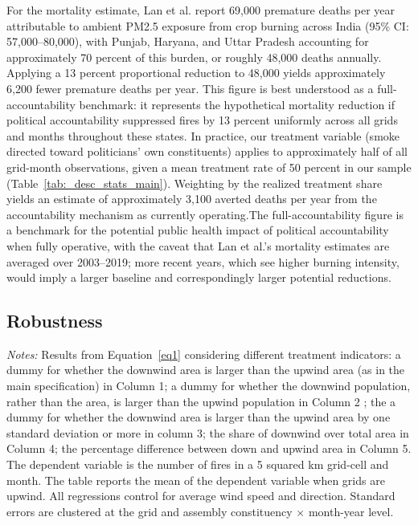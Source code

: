 \documentclass[12pt]{article}
\begin{document}
For the mortality estimate, Lan et al. report 69,000 premature deaths per year attributable to ambient PM2.5 exposure from crop burning across India (95\% CI: 57,000–80,000), with Punjab, Haryana, and Uttar Pradesh accounting for approximately 70 percent of this burden, or roughly 48,000 deaths annually. Applying a 13 percent proportional reduction to 48,000 yields approximately 6,200 fewer premature deaths per year. This figure is best understood as a full-accountability benchmark: it represents the hypothetical mortality reduction if political accountability suppressed fires by 13 percent uniformly across all grids and months throughout these states. In practice, our treatment variable (smoke directed toward politicians' own constituents) applies to approximately half of all grid-month observations, given a mean treatment rate of 50 percent in our sample (Table~\ref{tab:_desc_stats_main}). Weighting by the realized treatment share yields an estimate of approximately 3,100 averted deaths per year from the accountability mechanism as currently operating.The full-accountability figure is a benchmark for the potential public health impact of political accountability when fully operative, with the caveat that Lan et al.'s mortality estimates are averaged over 2003–2019; more recent years, which see higher burning intensity, would imply a larger baseline and correspondingly larger potential reductions.



\newpage 
\subsection{Robustness}
 \begin{table}[h!]
     \centering
     \caption{Effect of constituency exposure to smoke on number of fires, robustness by treatment indicator \label{tab:main_by_treat}}
     \resizebox{0.8\textwidth}{!}{
      
      }
      \begin{minipage}{\textwidth}
         {\small \textit{Notes: }Results from Equation~\ref{eq1}  considering different treatment indicators: a dummy for whether the downwind area is larger than the upwind area (as in the main specification) in Column 1; a dummy for whether the downwind population, rather than the area, is larger than the upwind population in Column 2 ; the a dummy for whether the downwind area is larger than the upwind area by one standard deviation or more in column 3; the share of downwind over total area in Column 4; the percentage difference between down and upwind area in Column 5. The dependent variable is the number of fires in a 5 squared km grid-cell and month. 
         The table reports the mean of the dependent variable when grids are upwind. All regressions control for average wind speed and direction. Standard errors are clustered at the grid and assembly constituency $\times$ month-year level. }
     \end{minipage}
 \end{table}
\end{document}
